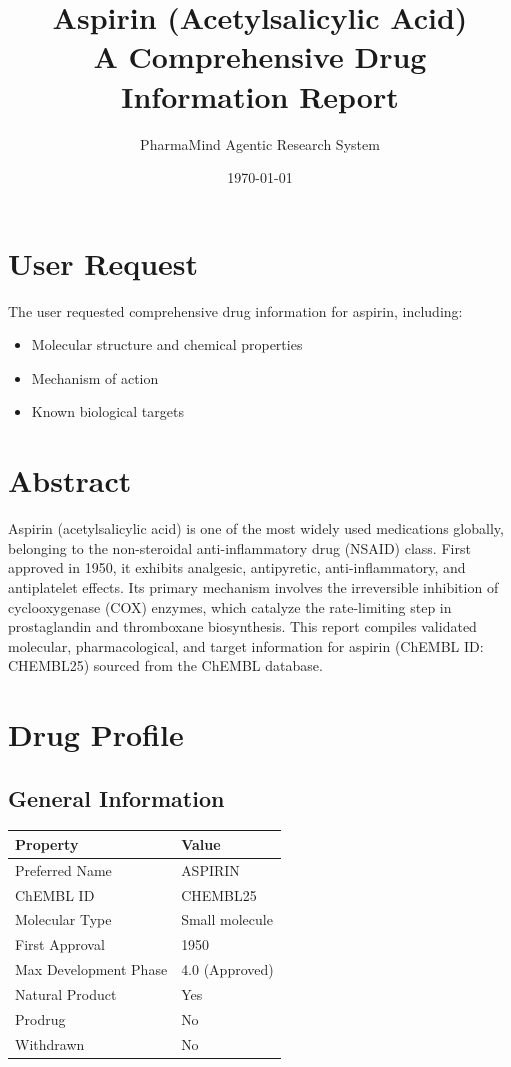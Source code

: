 \documentclass[11pt, a4paper]{article}
\title{Aspirin (Acetylsalicylic Acid) \\ \large A Comprehensive Drug Information Report}
\author{PharmaMind Agentic Research System}
\date{\today}
\begin{document}
\maketitle
\tableofcontents
\newpage

\section{User Request}
The user requested comprehensive drug information for aspirin, including:
\begin{itemize}
    \item Molecular structure and chemical properties
    \item Mechanism of action
    \item Known biological targets
\end{itemize}

\section{Abstract}
Aspirin (acetylsalicylic acid) is one of the most widely used medications globally, belonging to the non-steroidal anti-inflammatory drug (NSAID) class. First approved in 1950, it exhibits analgesic, antipyretic, anti-inflammatory, and antiplatelet effects. Its primary mechanism involves the irreversible inhibition of cyclooxygenase (COX) enzymes, which catalyze the rate-limiting step in prostaglandin and thromboxane biosynthesis. This report compiles validated molecular, pharmacological, and target information for aspirin (ChEMBL ID: CHEMBL25) sourced from the ChEMBL database.

\section{Drug Profile}
\subsection{General Information}
\begin{table}[h!]
\centering
\begin{tabular}{ll}
\toprule
\textbf{Property} & \textbf{Value} \\
\midrule
Preferred Name & ASPIRIN \\
ChEMBL ID & CHEMBL25 \\
Molecular Type & Small molecule \\
First Approval & 1950 \\
Max Development Phase & 4.0 (Approved) \\
Natural Product & Yes \\
Prodrug & No \\
Withdrawn & No \\
\bottomrule
\end{tabular}
\end{table}
\end{document}
